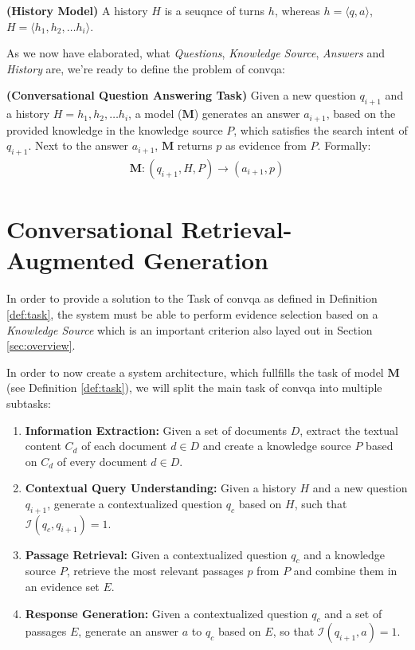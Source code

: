 \begin{definition}
    \textbf{(History Model)} A history $H$ is a seuqnce of turns $h$, whereas $h = \langle q,a\rangle$, $H = \langle h_1, h_2, \dots h_i\rangle$.
    \label{def:history_model}
\end{definition}

As we now have elaborated, what \textit{Questions}, \textit{Knowledge Source}, \textit{Answers} and \textit{History} are, we're ready to define the problem of \gls{convqa}:

\begin{definition}
    \textbf{(Conversational Question Answering Task)} Given a new question $q_{i+1}$ and a history $H = {h_1, h_2, \dots h_i}$, a model ($\mathbf{M}$) generates an answer $a_{i+1}$, based on the provided knowledge in the knowledge source $P$, which satisfies the search intent of $q_{i+1}$. Next to the answer $a_{i+1}$, $\mathbf{M}$ returns $p$ as evidence from $P$. Formally:
    \begin{align*}
        \mathbf{M}: (q_{i+1}, H, P) \rightarrow (a_{i+1}, p)
    \end{align*}
    \label{def:task}
\end{definition}

\section{Conversational Retrieval-Augmented Generation}
\label{sec:conrag}

In order to provide a solution to the Task of \gls{convqa} as defined in Definition \ref{def:task}, the system must be able to perform evidence selection based on a \textit{Knowledge Source} which is an important criterion also layed out in Section \ref{sec:overview}. 

In order to now create a system architecture, which fullfills the task of model $\mathbf{M}$ (see Definition \ref{def:task}), we will split the main task of \gls{convqa} into multiple subtasks:

\begin{enumerate}
    \item \textbf{Information Extraction:} Given a set of documents $D$, extract the textual content $C_d$ of each document $d \in D$ and create a knowledge source $P$ based on $C_d$ of every document $d \in D$.
    \item \textbf{Contextual Query Understanding:} Given a history $H$ and a new question $q_{i+1}$, generate a contextualized question $q_c$ based on $H$, such that $\mathcal{I}(q_c,q_{i+1}) = 1$.
    \item \textbf{Passage Retrieval:} Given a contextualized question $q_c$ and a knowledge source $P$, retrieve the most relevant passages $p$ from $P$ and combine them in an evidence set $E$.
    \item \textbf{Response Generation:} Given a contextualized question $q_c$ and a set of passages $E$, generate an answer $a$ to $q_c$ based on $E$, so that $\mathcal{I}(q_{i+1},a) = 1$.
\end{enumerate}

